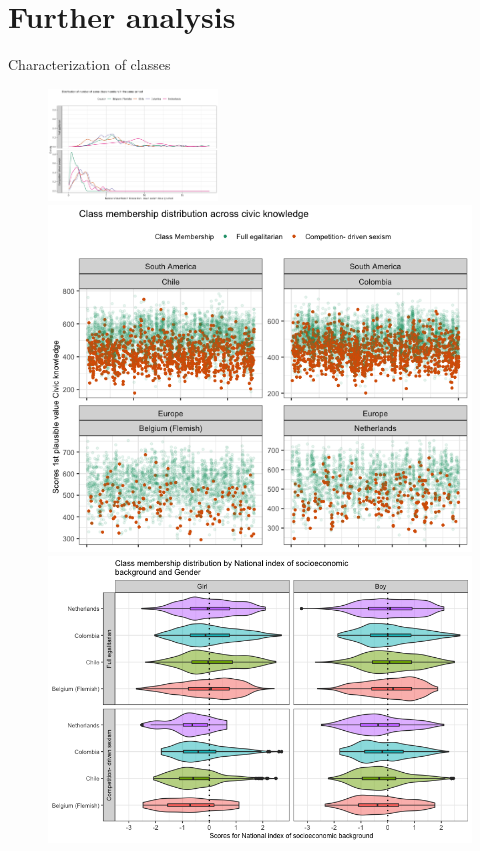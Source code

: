 \documentclass[11pt,t]{beamer}
\begin{document}
\section{Further analysis}
%
%
\begin{frame}{Characterization of classes}
\begin{figure}
	\includegraphics[width=0.4\textwidth]{graphics/schoolsize.png}\\
	\includegraphics[height=0.3\textwidth]{graphics/civickn.png} 
	\includegraphics[height=0.3\textwidth]{graphics/gendernisb.png}
\end{figure}
\end{frame} 
\end{document}
